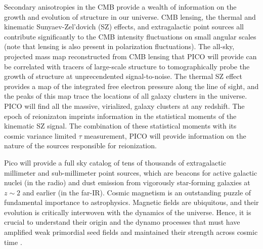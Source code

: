 \documentclass[PICOReport.tex]{subfiles}
\begin{document}




Secondary anisotropies in the CMB provide a wealth of information on the growth and evolution of structure in our universe. CMB lensing, the thermal and kinematic Sunyaev-Zel'dovich (SZ) effects, and extragalactic point sources all contribute significantly to the CMB intensity fluctuations on small angular scales (note that lensing is also present in polarization fluctuations). The all-sky, projected mass map reconstructed from CMB lensing that PICO will provide can be correlated with tracers of large-scale structure to tomographically probe the growth of structure at unprecendented signal-to-noise. The thermal SZ effect provides a map of the integrated free electron pressure along the line of sight, and the peaks of this map trace the locations of all galaxy clusters in the universe. PICO will find all the massive, virialized, galaxy clusters at any redshift.  The epoch of reionizaton imprints information in the statistical moments of the kinematic SZ signal.  The combination of these statistical moments with its cosmic variance limited $\tau$ measurement, PICO will provide information on the nature of the sources responsible for reionization.

Pico will provide a full sky catalog of tens of thousands of extragalactic millimeter and sub-millimeter point sources, which are beacons for active galactic nuclei (in the radio) and dust emission from vigorously star-forming galaxies at $z \sim 2$ and earlier (in the far-IR). Cosmic magnetism is an outstanding puzzle of fundamental importance to astrophysics. Magnetic fields are ubiquitous, and their evolution is critically interwoven with the dynamics of the universe. Hence, it is crucial to understand their origin and the dynamo processes that must have amplified weak  primordial seed fields and maintained their strength across cosmic time \citep{Brandenburg2005}. 
\end{document}
